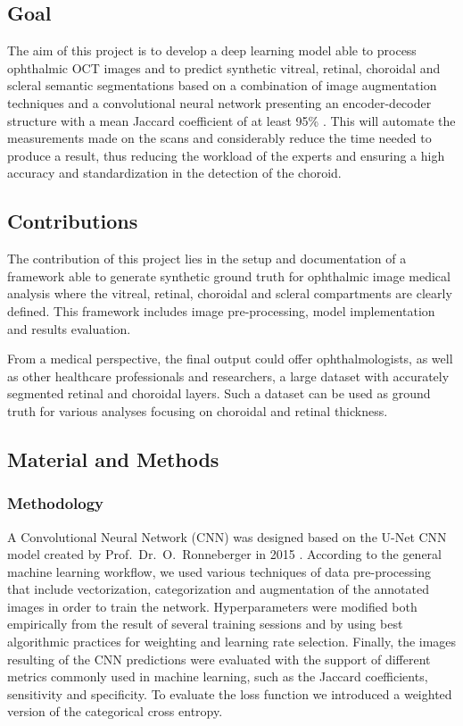 \documentclass[12pt,a4paper]{scrartcl}
\begin{document}
\subsection{Goal}
The aim of this project is to develop a deep learning model able to process ophthalmic OCT images and to predict  synthetic vitreal, retinal, choroidal and scleral semantic  segmentations based on a combination of image augmentation  techniques and a convolutional neural network presenting an encoder-decoder structure with a mean Jaccard coefficient of at least 95\%   \cite{Maloca2019}. This will automate the measurements made on the scans and considerably reduce the time needed to produce a result, thus reducing the workload of the experts and ensuring a high accuracy and standardization in the detection of the choroid. 

\subsection{Contributions}

The contribution of this project lies in the setup and documentation of a framework able to generate synthetic ground truth for ophthalmic image medical analysis where the vitreal, retinal, choroidal and scleral compartments are clearly defined. This framework includes image pre-processing, model implementation and results evaluation. 

From a medical perspective, the final output could offer ophthalmologists, as well as other healthcare professionals and researchers, a large dataset with accurately segmented retinal and choroidal layers. Such a dataset can be used as ground truth for various analyses focusing on choroidal and retinal thickness.

\subsection{Material and Methods}

\subsubsection{Methodology}

A Convolutional Neural Network (CNN) was designed based on the U-Net CNN model created by Prof.~Dr.~O.~Ronneberger in 2015 \cite{Ronneberger2015}. According to the general machine learning workflow, we used various techniques of data pre-processing that include vectorization, categorization and augmentation of the annotated images in order to train the network. Hyperparameters were modified both empirically from the result of several training sessions and by using best algorithmic practices for weighting and learning rate selection. Finally, the images resulting of the CNN predictions were evaluated with the support of different metrics commonly used in machine learning, such as the Jaccard coefficients, sensitivity and specificity. To evaluate the loss function we introduced a weighted version of the categorical cross entropy. 
\end{document}
